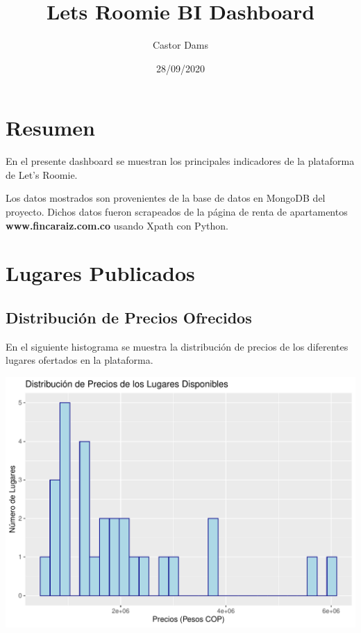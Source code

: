 \documentclass[
  landscape]{article}
\title{Lets Roomie BI Dashboard}
\author{Castor Dams}
\date{28/09/2020}
\begin{document}
\maketitle

\renewcommand{\contentsname}{Indice de Indicadores}

\tableofcontents

\newpage

\hypertarget{resumen}{%
\section{Resumen}\label{resumen}}

En el presente dashboard se muestran los principales indicadores de la
plataforma de Let's Roomie.

Los datos mostrados son provenientes de la base de datos en MongoDB del
proyecto. Dichos datos fueron scrapeados de la página de renta de
apartamentos \textbf{www.fincaraiz.com.co} usando Xpath con Python.

\hypertarget{lugares-publicados}{%
\section{Lugares Publicados}\label{lugares-publicados}}

\hypertarget{distribuciuxf3n-de-precios-ofrecidos}{%
\subsection{Distribución de Precios
Ofrecidos}\label{distribuciuxf3n-de-precios-ofrecidos}}

En el siguiente histograma se muestra la distribución de precios de los
diferentes lugares ofertados en la plataforma.

\begin{center}\includegraphics{BI_reporting_files/figure-latex/WebScraper_Constants-1} \end{center}
\end{document}
